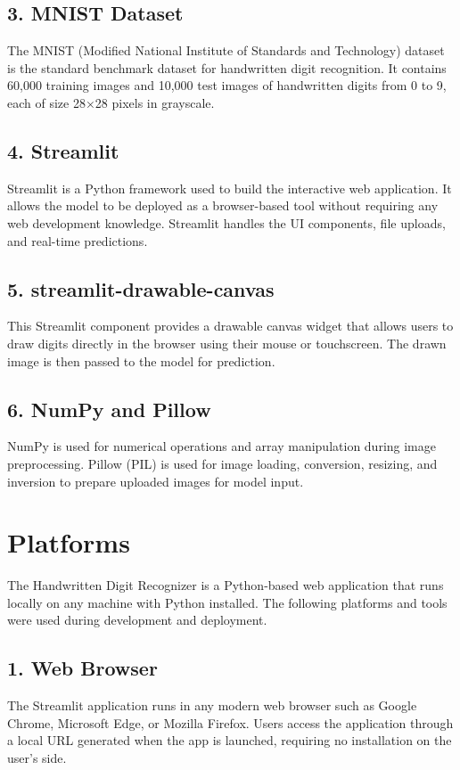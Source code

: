 \documentclass[12pt,a4paper]{report}
\begin{document}
\subsection*{3. MNIST Dataset}
The MNIST (Modified National Institute of Standards and Technology) dataset is the standard benchmark dataset for handwritten digit recognition. It contains 60,000 training images and 10,000 test images of handwritten digits from 0 to 9, each of size 28×28 pixels in grayscale.

\subsection*{4. Streamlit}
Streamlit is a Python framework used to build the interactive web application. It allows the model to be deployed as a browser-based tool without requiring any web development knowledge. Streamlit handles the UI components, file uploads, and real-time predictions.

\subsection*{5. streamlit-drawable-canvas}
This Streamlit component provides a drawable canvas widget that allows users to draw digits directly in the browser using their mouse or touchscreen. The drawn image is then passed to the model for prediction.

\subsection*{6. NumPy and Pillow}
NumPy is used for numerical operations and array manipulation during image preprocessing. Pillow (PIL) is used for image loading, conversion, resizing, and inversion to prepare uploaded images for model input.

\newpage
\section{Platforms}
The Handwritten Digit Recognizer is a Python-based web application that runs locally on any machine with Python installed. The following platforms and tools were used during development and deployment.

\subsection*{1. Web Browser}
The Streamlit application runs in any modern web browser such as Google Chrome, Microsoft Edge, or Mozilla Firefox. Users access the application through a local URL generated when the app is launched, requiring no installation on the user's side.
\end{document}

